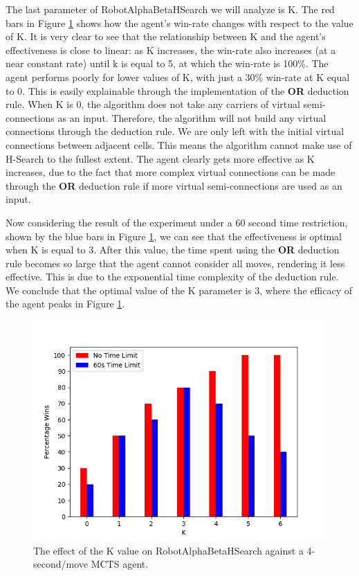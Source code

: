 The last parameter of RobotAlphaBetaHSearch we will analyze is K. The red bars in Figure \ref{fig:hsearch_k_perf} shows how the agent's win-rate changes with respect to the value of K. It is very clear to see that the relationship between K and the agent's effectiveness is close to linear: as K increases, the win-rate also increases (at a near constant rate) until k is equal to 5, at which the win-rate is 100\%. The agent performs poorly for lower values of K, with just a 30\% win-rate at K equal to 0. This is easily explainable through the implementation of the \textbf{OR} deduction rule. When K is 0, the algorithm does not take any carriers of virtual semi-connections as an input. Therefore, the algorithm will not build any virtual connections through the deduction rule. We are only left with the initial virtual connections between adjacent cells. This means the algorithm cannot make use of H-Search to the fullest extent. The agent clearly gets more effective as K increases, due to the fact that more complex virtual connections can be made through the \textbf{OR} deduction rule if more virtual semi-connections are used as an input.

Now considering the result of the experiment under a 60 second time restriction, shown by the blue bars in Figure \ref{fig:hsearch_k_perf}, we can see that the effectiveness is optimal when K is equal to 3. After this value, the time spent using the \textbf{OR} deduction rule becomes so large that the agent cannot consider all moves, rendering it less effective. This is due to the exponential time complexity of the deduction rule. We conclude that the optimal value of the K parameter is 3, where the efficacy of the agent peaks in Figure \ref{fig:hsearch_k_perf}.



\begin{figure}
    \centering
    \includegraphics[scale = 0.6]{images/HSEARCHK_PERF.png}
    \caption{The effect of the K value on RobotAlphaBetaHSearch against a 4-second/move MCTS agent.}
    \label{fig:hsearch_k_perf}
\end{figure}









